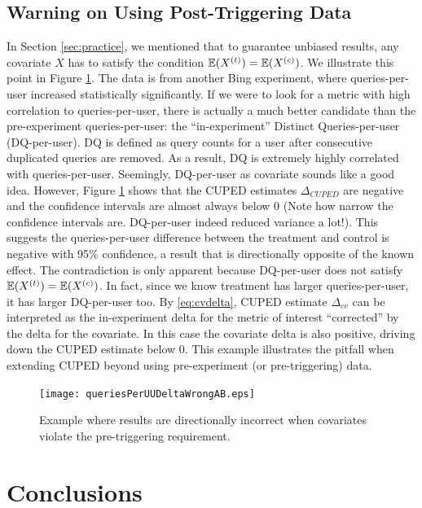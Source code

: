 \documentclass{sig-alternate}
\begin{document}
\subsection{Warning on Using Post-Triggering Data}
In Section \ref{sec:practice}, we mentioned that to guarantee unbiased results, any covariate $X$ has to satisfy the condition $\mathbb{E}(X^{(t)})=\mathbb{E}(X^{(c)})$. We illustrate this point in Figure \ref{fig:QueriesPerUUWrong}. The data is from another Bing experiment, where queries-per-user increased statistically significantly. If we were to look for a metric with high correlation to queries-per-user, there is actually a much better candidate than the pre-experiment queries-per-user: the ``in-experiment'' Distinct Queries-per-user (DQ-per-user).  DQ is defined as query counts for a user after consecutive duplicated queries are removed. As a result, DQ is extremely highly correlated with queries-per-user. Seemingly, DQ-per-user as covariate sounds like a good idea. However, Figure \ref{fig:QueriesPerUUWrong} shows that the CUPED estimates $\Delta_{CUPED}$ are negative and the confidence intervals are almost always below $0$ (Note how narrow the confidence intervals are. DQ-per-user indeed reduced variance a lot!). This suggests the queries-per-user difference between the treatment and control is negative with 95\% confidence, a result that is directionally opposite of the known effect. The contradiction is only apparent because DQ-per-user does not satisfy $\mathbb{E}(X^{(t)})=\mathbb{E}(X^{(c)})$. In fact, since we know treatment has larger queries-per-user, it has larger DQ-per-user too. By \eqref{eq:cvdelta}, CUPED estimate $\Delta_{cv}$ can be interpreted as the in-experiment delta for the metric of interest ``corrected'' by the delta for the covariate. In this case the covariate delta is also positive, driving down the CUPED estimate below $0$. This example illustrates the pitfall when extending CUPED beyond using pre-experiment (or pre-triggering) data. 
\begin{figure}[!hbtp]
  \centering
  \texttt{[image: queriesPerUUDeltaWrongAB.eps]}
  \caption{Example where results are directionally incorrect when covariates violate the pre-triggering requirement.}
  \label{fig:QueriesPerUUWrong}
\end{figure}


\section{Conclusions}\label{sec:conclusion}

\end{document}
